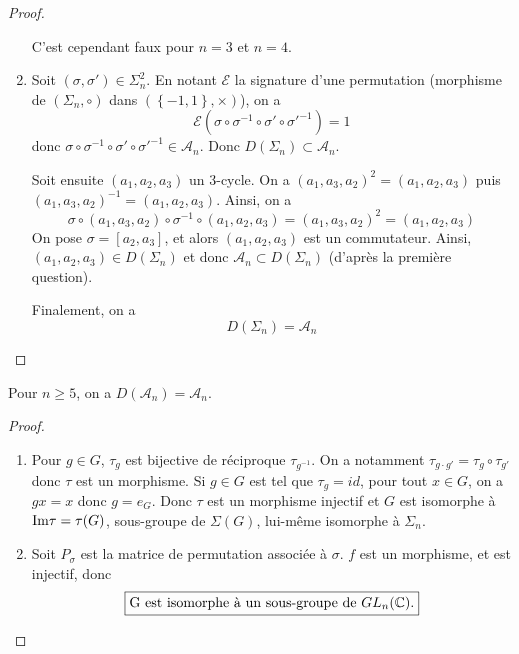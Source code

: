 \documentclass[12pt]{article}
\begin{document}
\begin{proof}
\begin{enumerate}
		C'est cependant faux pour $n=3$ et $n=4$.

		\item Soit $(\sigma,\sigma')\in\Sigma_{n}^{2}$. En notant $\mathcal{E}$ la signature d'une permutation (morphisme de $(\Sigma_{n},\circ)$ dans $(\left\{-1,1\right\},\times)$), on a
		\begin{equation}
			\mathcal{E}(\sigma\circ\sigma^{-1}\circ\sigma'\circ\sigma'^{-1})=1
		\end{equation}
		donc $\sigma\circ\sigma^{-1}\circ\sigma'\circ\sigma'^{-1}\in\mathcal{A}_{n}$. Donc $D(\Sigma_{n})\subset\mathcal{A}_{n}$.

		Soit ensuite $(a_{1},a_{2},a_{3})$ un 3-cycle. On a $(a_{1},a_{3},a_{2})^{2}=(a_{1},a_{2},a_{3})$ puis\\$(a_{1},a_{3},a_{2})^{-1}=(a_{1},a_{2},a_{3})$. Ainsi, on a 
		\begin{equation}
			\sigma\circ(a_{1},a_{3},a_{2})\circ\sigma^{-1}\circ(a_{1},a_{2},a_{3})=(a_{1},a_{3},a_{2})^{2}=(a_{1},a_{2},a_{3})
		\end{equation}
		On pose $\sigma=[a_{2},a_{3}]$, et alors $(a_{1},a_{2},a_{3})$ est un commutateur. Ainsi, $(a_{1},a_{2},a_{3})\in D(\Sigma_{n})$ et donc $\mathcal{A}_{n}\subset D(\Sigma_{n})$ (d'après la première question).

		Finalement, on a 
		\begin{equation}
			\boxed{D(\Sigma_{n})=\mathcal{A}_{n}}
		\end{equation}
	\end{enumerate}
\end{proof}

\begin{remark}
	Pour $n\geqslant5$, on a $D(\mathcal{A}_{n})=\mathcal{A}_{n}$.
\end{remark}

\begin{proof}
	\phantom{}
	\begin{enumerate}
		\item Pour $g\in G$, $\tau_{g}$ est bijective de réciproque $\tau_{g^{-1}}$. On a notamment $\tau_{g\cdot g'}=\tau_{g}\circ\tau_{g'}$ donc $\tau$ est un morphisme. Si $g\in G$ est tel que $\tau_{g}=id$, pour tout $x\in G$, on a $gx=x$ donc $g=e_{G}$. Donc $\tau$ est un morphisme injectif et 
		$G$ est isomorphe à $\mathrm{Im}\tau=\tau(G)$, sous-groupe de $\Sigma(G)$, lui-même isomorphe à $\Sigma_{n}$.
		
		\item Soit 
		$P_{\sigma}$ est la matrice de permutation associée à $\sigma$. $f$ est un morphisme, et est injectif, donc 
		\begin{equation}
			\boxed{\text{G est isomorphe à un sous-groupe de }GL_{n}(\mathbb{C}).}
		\end{equation}
	\end{enumerate}
\end{proof}
\end{document}
